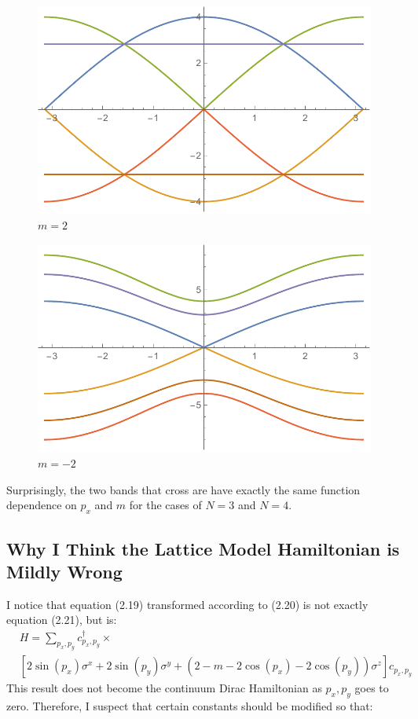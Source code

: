 \documentclass{article}
\begin{document}
\begin{figure}[H]
    \centering
    \includegraphics[width=0.6\linewidth]{pics/N8m2.pdf}
    \caption{$m=2$}
\end{figure}
\begin{figure}[H]
    \centering
    \includegraphics[width=0.6\linewidth]{pics/N8m-2.pdf}
    \caption{$m=-2$}
\end{figure}

Surprisingly, the two bands that cross are have exactly the same
function dependence on $p_x$ and $m$ for the cases of $N=3$ and
$N=4$.

\subsection{Why I Think the Lattice Model Hamiltonian is Mildly Wrong}
\label{sec:Why-LatticeM-m-wrong}

I notice that equation (2.19) transformed according to (2.20)
is not exactly equation (2.21), but is:
\begin{align}
    &H =\sum_{p_x,p_y} c^\dagger_{p_x,p_y}\times
    \nonumber\\
    &
    \left[
        2\sin(p_x)\sigma^x + 2\sin(p_y)\sigma^y
        +(2-m-2\cos(p_x)-2\cos(p_y))\sigma^z
    \right] c_{p_x,p_y}
\end{align}
This result does not become the continuum Dirac Hamiltonian as
$p_x,p_y$ goes to zero. Therefore, I suspect that certain
constants should be modified so that:
\end{document}
